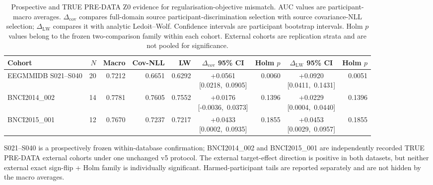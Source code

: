 \begin{table}[t]
\centering
\caption{Prospective and TRUE PRE-DATA Z0 evidence for regularisation-objective mismatch. AUC values are participant-macro averages. $\Delta_{\mathrm{cov}}$ compares full-domain source participant-discrimination selection with source covariance-NLL selection; $\Delta_{\mathrm{LW}}$ compares it with analytic Ledoit--Wolf. Confidence intervals are participant bootstrap intervals. Holm $p$ values belong to the frozen two-comparison family within each cohort. External cohorts are replication strata and are not pooled for significance.}
\label{tab:main-prospective-results}
\scriptsize
\setlength{\tabcolsep}{3.2pt}
\renewcommand{\arraystretch}{1.12}
\begin{tabular}{lrrrrcrcr}
\toprule
Cohort & $N$ & Macro & Cov-NLL & LW &
\shortstack{$\Delta_{\mathrm{cov}}$\\95\% CI} &
Holm $p$ &
\shortstack{$\Delta_{\mathrm{LW}}$\\95\% CI} &
Holm $p$ \\
\midrule
EEGMMIDB S021--S040
& 20 & 0.7212 & 0.6651 & 0.6292
& \shortstack{+0.0561\\\mbox{[0.0218, 0.0905]}}
& 0.0060
& \shortstack{+0.0920\\\mbox{[0.0411, 0.1431]}}
& 0.0051 \\
BNCI2014\_002
& 14 & 0.7781 & 0.7605 & 0.7552
& \shortstack{+0.0176\\\mbox{[-0.0036, 0.0373]}}
& 0.1396
& \shortstack{+0.0229\\\mbox{[0.0004, 0.0440]}}
& 0.1396 \\
BNCI2015\_001
& 12 & 0.7670 & 0.7237 & 0.7217
& \shortstack{+0.0433\\\mbox{[0.0002, 0.0935]}}
& 0.1855
& \shortstack{+0.0453\\\mbox{[0.0029, 0.0957]}}
& 0.1855 \\
\bottomrule
\end{tabular}

\vspace{1mm}
\footnotesize
S021--S040 is a prospectively frozen within-database confirmation; BNCI2014\_002 and BNCI2015\_001 are independently recorded TRUE PRE-DATA external cohorts under one unchanged v5 protocol. The external target-effect direction is positive in both datasets, but neither external exact sign-flip + Holm family is individually significant. Harmed-participant tails are reported separately and are not hidden by the macro averages.
\end{table}
